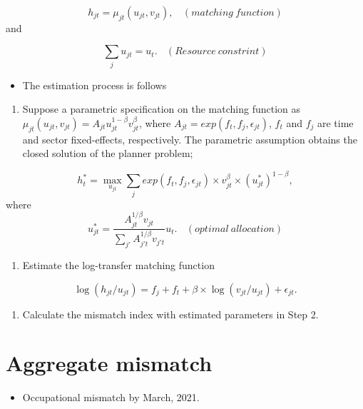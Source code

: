 \documentclass[
]{book}
\providecommand{\tightlist}{%
  \setlength{\itemsep}{0pt}\setlength{\parskip}{0pt}}
\begin{document}
\[h_{jt}=\mu_{jt}(u_{jt},v_{jt}),\ \ \ \ (matching\ function)\]
and

\[\sum_{j}u_{jt}=u_t.\ \ \ \ (Resource\ constrint)\]

\begin{itemize}
\tightlist
\item
  The estimation process is follows
\end{itemize}

\begin{enumerate}
\def\labelenumi{\arabic{enumi}.}
\tightlist
\item
  Suppose a parametric specification on the matching function as \(\mu_{jt}(u_{jt},v_{jt})=A_{jt}u_{jt}^{1-\beta}v_{jt}^{\beta}\), where \(A_{jt}=exp(f_t,f_j,\epsilon_{jt})\), \(f_t\) and \(f_j\) are time and sector fixed-effects, respectively.
  The parametric assumption obtains the closed solution of the planner problem;
\end{enumerate}

\[h_t^*=\max_{u_{jt}} \sum_j exp(f_t,f_j,\epsilon_{jt})\times v_{jt}^{\beta}\times (u_{jt}^*)^{1-\beta},\]
where
\[u_{jt}^*=\frac{A_{jt}^{1/\beta}v_{jt}}{\sum_{j'}A_{j't}^{1/\beta}v_{j't}}u_{t}.\ \ \ \ (optimal\ allocation)\]

\begin{enumerate}
\def\labelenumi{\arabic{enumi}.}
\setcounter{enumi}{1}
\tightlist
\item
  Estimate the log-transfer matching function
\end{enumerate}

\[\log(h_{jt}/u_{jt})=f_{j}+f_{t}+\beta\times\log(v_{jt}/u_{jt})+\epsilon_{jt}.\]

\begin{enumerate}
\def\labelenumi{\arabic{enumi}.}
\setcounter{enumi}{2}
\tightlist
\item
  Calculate the mismatch index with estimated parameters in Step 2.
\end{enumerate}

\hypertarget{aggregate-mismatch}{%
\section{Aggregate mismatch}\label{aggregate-mismatch}}

\begin{itemize}
\tightlist
\item
  Occupational mismatch by March, 2021.
\end{itemize}
\end{document}
